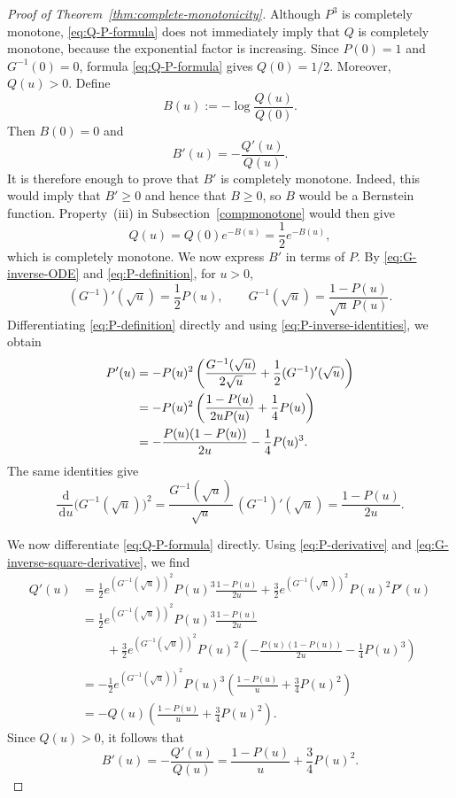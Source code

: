 \documentclass[11pt]{article}
\theoremstyle{definition}
\theoremstyle{remark}
\newcommand{\dd}{\,\mathrm d}
\begin{document}
\begin{proof}[Proof of Theorem~\ref{thm:complete-monotonicity}]
Although $P^3$ is completely monotone,
\eqref{eq:Q-P-formula} does not immediately imply that $Q$ is
completely monotone, because the exponential factor is increasing.
Since $P(0)=1$ and $G^{-1}(0)=0$, formula
\eqref{eq:Q-P-formula} gives $Q(0)=1/2$.  Moreover, $Q(u)>0$.
Define
\begin{equation}\label{eq:B}
 B(u):=-\log\frac{Q(u)}{Q(0)}.
\end{equation}
Then $B(0)=0$ and
\[
 B'(u)=-\frac{Q'(u)}{Q(u)}.
\]
It is therefore enough to prove that $B'$ is completely monotone.
Indeed, this would imply that $B'\geq0$ and hence that $B\geq0$, so
$B$ would be a Bernstein function.  Property~(iii) in
Subsection~\ref{compmonotone} would then give
\[
 Q(u)=Q(0)e^{-B(u)}=\frac12e^{-B(u)},
\]
which is completely monotone.  We now express $B'$ in terms of $P$.  By
\eqref{eq:G-inverse-ODE} and \eqref{eq:P-definition}, for $u>0$,
\begin{equation}\label{eq:P-inverse-identities}
 (G^{-1})'(\sqrt{u})=\frac12P(u),
 \qquad
 G^{-1}(\sqrt{u})
 =\frac{1-P(u)}{\sqrt{u}\,P(u)}.
\end{equation}
Differentiating \eqref{eq:P-definition} directly and using
\eqref{eq:P-inverse-identities}, we obtain
\begin{align}
 P'(u)
 &=-P(u)^2\left(
 \frac{G^{-1}(\sqrt{u})}{2\sqrt{u}}
 +\frac12(G^{-1})'(\sqrt{u})
 \right) \notag\\
 &=-P(u)^2\left(
 \frac{1-P(u)}{2uP(u)}+\frac14P(u)
 \right) \notag\\
 &=-\frac{P(u)(1-P(u))}{2u}-\frac14P(u)^3.
 \label{eq:P-derivative}
\end{align}
The same identities give
\begin{equation}\label{eq:G-inverse-square-derivative}
 \frac{\dd}{\dd u}\bigl(G^{-1}(\sqrt{u})\bigr)^2
 =
 \frac{G^{-1}(\sqrt{u})}{\sqrt{u}}\,
 (G^{-1})'(\sqrt{u})
 =\frac{1-P(u)}{2u}.
\end{equation}

We now differentiate \eqref{eq:Q-P-formula} directly.  Using
\eqref{eq:P-derivative} and
\eqref{eq:G-inverse-square-derivative}, we find
\begin{align*}
 Q'(u)
 &=
 \frac12e^{(G^{-1}(\sqrt{u}))^2}P(u)^3
 \frac{1-P(u)}{2u}
 +\frac32e^{(G^{-1}(\sqrt{u}))^2}P(u)^2P'(u)
 \\
 &=
 \frac12e^{(G^{-1}(\sqrt{u}))^2}P(u)^3
 \frac{1-P(u)}{2u}
 \\
 &\qquad
 +\frac32e^{(G^{-1}(\sqrt{u}))^2}P(u)^2
 \left(
 -\frac{P(u)(1-P(u))}{2u}-\frac14P(u)^3
 \right)
 \\
 &=
 -\frac12e^{(G^{-1}(\sqrt{u}))^2}P(u)^3
 \left(
 \frac{1-P(u)}u+\frac34P(u)^2
 \right)
 \\
 &=
 -Q(u)\left(
 \frac{1-P(u)}u+\frac34P(u)^2
 \right).
\end{align*}
Since $Q(u)>0$, it follows that
\begin{equation}\label{eq:Q-log-derivative}
 B'(u)=-\frac{Q'(u)}{Q(u)}
 =\frac{1-P(u)}u+\frac34P(u)^2.
\end{equation}


\end{proof}
\end{document}
